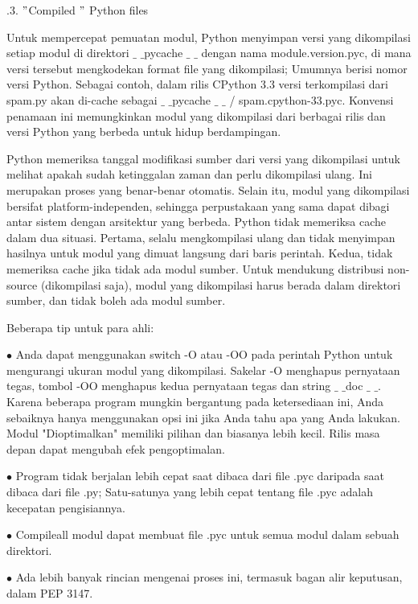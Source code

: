\vspace{12pt}
\vspace{12pt}
.3.  $ " $Compiled $ " $ Python files \par
\noindent 
Untuk mempercepat pemuatan modul, Python menyimpan versi yang dikompilasi setiap modul di direktori  $  \_  $ $  \_  $pycache $  \_  $ $  \_  $ dengan nama module.version.pyc, di mana versi tersebut mengkodekan format file yang dikompilasi; Umumnya berisi nomor versi Python. Sebagai contoh, dalam rilis CPython 3.3 versi terkompilasi dari spam.py akan di-cache sebagai  $  \_  $ $  \_  $pycache  $  \_  $ $  \_  $ / spam.cpython-33.pyc. Konvensi penamaan ini memungkinkan modul yang dikompilasi dari berbagai rilis dan versi Python yang berbeda untuk hidup berdampingan.  \par
\vspace{12pt}
\noindent 
Python memeriksa tanggal modifikasi sumber dari versi yang dikompilasi untuk melihat apakah sudah ketinggalan zaman dan perlu dikompilasi ulang. Ini merupakan proses yang benar-benar otomatis. Selain itu, modul yang dikompilasi bersifat platform-independen, sehingga perpustakaan yang sama dapat dibagi antar sistem dengan arsitektur yang berbeda. Python tidak memeriksa cache dalam dua situasi. Pertama, selalu mengkompilasi ulang dan tidak menyimpan hasilnya untuk modul yang dimuat langsung dari baris perintah. Kedua, tidak memeriksa cache jika tidak ada modul sumber. Untuk mendukung distribusi non-source (dikompilasi saja), modul yang dikompilasi harus berada dalam direktori sumber, dan tidak boleh ada modul sumber. \par
\vspace{12pt}
\vspace{12pt}
\vspace{12pt}
\vspace{12pt}
\vspace{12pt}
\vspace{12pt}
\noindent 
Beberapa tip untuk para ahli: \par
\noindent 
 $ \bullet $ Anda dapat menggunakan switch -O atau -OO pada perintah Python untuk mengurangi ukuran modul yang dikompilasi. Sakelar -O menghapus pernyataan tegas, tombol -OO menghapus kedua pernyataan tegas dan string  $  \_  $ $  \_  $doc $  \_  $ $  \_  $. Karena beberapa program mungkin bergantung pada ketersediaan ini, Anda sebaiknya hanya menggunakan opsi ini jika Anda tahu apa yang Anda lakukan. Modul "Dioptimalkan" memiliki pilihan dan biasanya lebih kecil. Rilis masa depan dapat mengubah efek pengoptimalan. \par
\noindent 
 $ \bullet $ Program tidak berjalan lebih cepat saat dibaca dari file .pyc daripada saat dibaca dari file .py; Satu-satunya yang lebih cepat tentang file .pyc adalah kecepatan pengisiannya. \par
\noindent 
 $ \bullet $ Compileall modul dapat membuat file .pyc untuk semua modul dalam sebuah direktori. \par
\noindent 
 $ \bullet $ Ada lebih banyak rincian mengenai proses ini, termasuk bagan alir keputusan, dalam PEP 3147. \par

